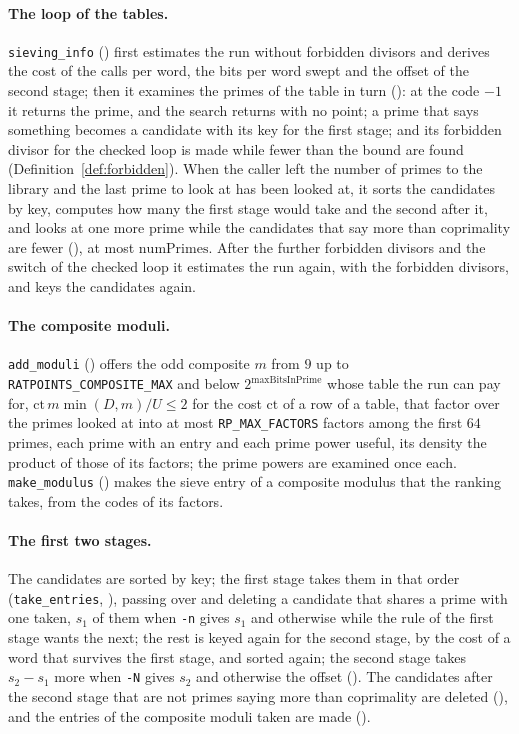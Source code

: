\paragraph{The loop of the tables.} \verb|sieving_info| () first
estimates the run without forbidden divisors and derives the cost of the calls per word, the bits
per word swept and the offset of the second stage; then it examines the primes of the table in turn
(): at the code $-1$ it returns the prime, and the search returns
with no point; a prime that says something becomes a candidate with its key for the first stage; and
its forbidden divisor for the checked loop is made while fewer than the bound are found
(Definition~\ref{def:forbidden}). When the caller left the number of primes to the library and the
last prime to look at has been looked at, it sorts the candidates by key, computes how many the
first stage would take and the second after it, and looks at one more prime while the candidates
that say more than coprimality are fewer (), at most
$\mathrm{numPrimes}$. After the further forbidden divisors and the switch of the checked loop it
estimates the run again, with the forbidden divisors, and keys the candidates again.

\paragraph{The composite moduli.} \verb|add_moduli| () offers the
odd composite $m$ from $9$ up to \verb|RATPOINTS_COMPOSITE_MAX| and below
$2^{\mathrm{maxBitsInPrime}}$ whose table the run can pay for, $\mathrm{ct}\, m \min(D, m)/U \le 2$
for the cost $\mathrm{ct}$ of a row of a table, that factor over the primes looked at into at most
\verb|RP_MAX_FACTORS| factors among the first $64$ primes, each prime with an entry and each prime
power useful, its density the product of those of its factors; the prime powers are examined once
each. \verb|make_modulus| () makes the sieve entry of a composite
modulus that the ranking takes, from the codes of its factors.

\paragraph{The first two stages.} The candidates are sorted by key; the first stage takes them in
that order (\verb|take_entries|, ), passing over and deleting a
candidate that shares a prime with one taken, $s_1$ of them when \verb|-n| gives $s_1$ and otherwise
while the rule of the first stage wants the next; the rest is keyed again for the second stage, by
the cost of a word that survives the first stage, and sorted again; the second stage takes
$s_2 - s_1$ more when \verb|-N| gives $s_2$ and otherwise the offset
(). The candidates after the second stage that are not primes
saying more than coprimality are deleted (), and the entries of
the composite moduli taken are made ().

